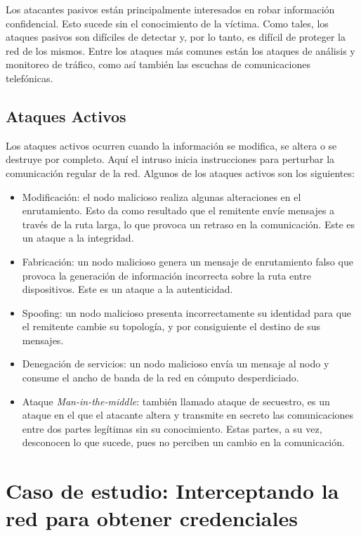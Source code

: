 Los atacantes pasivos están principalmente interesados en robar información 
confidencial. Esto sucede sin el conocimiento de la víctima. Como tales, 
los ataques pasivos son difíciles de detectar y, por lo tanto, es difícil de
proteger la red de los mismos. Entre los ataques más comunes están los 
ataques de análisis y monitoreo de tráfico, como así también las 
escuchas de comunicaciones telefónicas.

\subsection{Ataques Activos}
Los ataques activos ocurren cuando la información se modifica, se altera o 
se destruye por completo. Aquí el intruso inicia instrucciones para 
perturbar la comunicación regular de la red. Algunos de los ataques 
activos son los  siguientes:
\begin{itemize}
    \setlength\itemsep{-0.6em}
    \item Modificación: el nodo malicioso realiza algunas alteraciones en el
    enrutamiento. Esto da como resultado que el remitente envíe mensajes a 
    través de la ruta larga, lo que provoca un retraso en la comunicación. 
    Este es un ataque a la integridad.
    \item Fabricación: un nodo malicioso genera un mensaje de enrutamiento 
    falso que provoca la generación de información incorrecta sobre la ruta 
    entre dispositivos. Este es un ataque a la autenticidad.
    \item Spoofing: un nodo malicioso presenta incorrectamente su identidad 
    para que el remitente cambie su topología, y por consiguiente el 
    destino de sus mensajes.
    \item Denegación de servicios: un nodo malicioso envía un mensaje al 
    nodo y consume el ancho de banda de la red en cómputo desperdiciado.
    \item Ataque \emph{Man-in-the-middle}: también llamado ataque de secuestro, 
    es un ataque en el que el atacante altera y transmite en secreto 
    las comunicaciones entre dos partes legítimas sin su conocimiento. 
    Estas partes, a su vez, desconocen lo que sucede, pues no perciben 
    un cambio en la comunicación.
\end{itemize}


\section{Caso de estudio: Interceptando la red para obtener credenciales}
\label{secCaseOfStudy}


